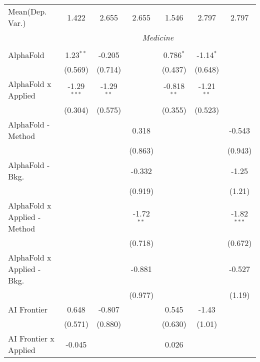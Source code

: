 \begin{tabular}{lcccccc}
Mean(Dep. Var.) & 1.422 & 2.655 & 2.655 & 1.546 & 2.797 & 2.797 \\
 & \multicolumn{6}{c}{\textit{Medicine}} \\ \\
   AlphaFold                    & 1.23$^{**}$   & -0.205       &              & 0.786$^{*}$   & -1.14$^{*}$  &   \\   
                                & (0.569)       & (0.714)      &              & (0.437)       & (0.648)      &   \\   
   AlphaFold x Applied          & -1.29$^{***}$ & -1.29$^{**}$ &              & -0.818$^{**}$ & -1.21$^{**}$ &   \\   
                                & (0.304)       & (0.575)      &              & (0.355)       & (0.523)      &   \\   
   AlphaFold - Method           &               &              & 0.318        &               &              & -0.543\\   
                                &               &              & (0.863)      &               &              & (0.943)\\   
   AlphaFold - Bkg.             &               &              & -0.332       &               &              & -1.25\\   
                                &               &              & (0.919)      &               &              & (1.21)\\   
   AlphaFold x Applied - Method &               &              & -1.72$^{**}$ &               &              & -1.82$^{***}$\\   
                                &               &              & (0.718)      &               &              & (0.672)\\   
   AlphaFold x Applied - Bkg.   &               &              & -0.881       &               &              & -0.527\\   
                                &               &              & (0.977)      &               &              & (1.19)\\   
   AI Frontier                  & 0.648         & -0.807       &              & 0.545         & -1.43        &   \\   
                                & (0.571)       & (0.880)      &              & (0.630)       & (1.01)       &   \\   
   AI Frontier x Applied        & -0.045        &              &              & 0.026         &              &   \\   

\end{tabular}
